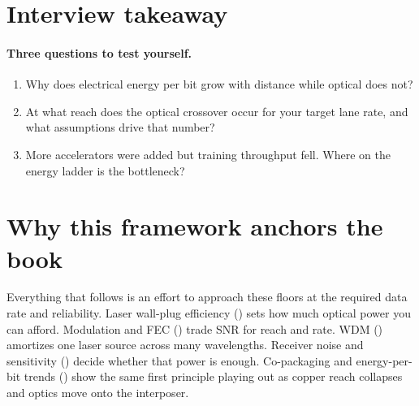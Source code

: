 \section{Interview takeaway}
\label{sec:firstprinciples-design-review}


\paragraph{Three questions to test yourself.}
\begin{enumerate}
\item Why does electrical energy per bit grow with distance while optical does not?
\item At what reach does the optical crossover occur for your target lane rate,
      and what assumptions drive that number?
\item More accelerators were added but training throughput fell. Where on the
      energy ladder is the bottleneck?
\end{enumerate}

\section{Why this framework anchors the book}

Everything that follows is an effort to approach these floors at the required data
rate and reliability. Laser wall-plug efficiency () sets how much
optical power you can afford. Modulation and FEC ()
trade SNR for reach and rate. WDM () amortizes one laser source across
many wavelengths. Receiver noise and sensitivity
() decide whether that power is
enough. Co-packaging and energy-per-bit trends () show the same
first principle playing out as copper reach collapses and optics move onto the
interposer.
